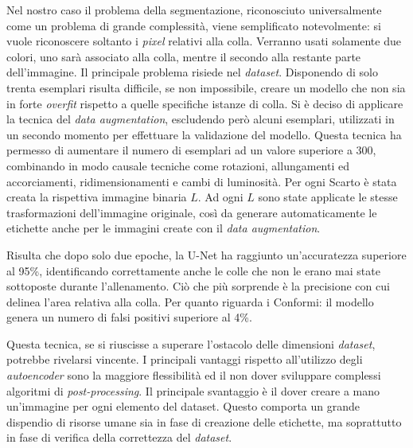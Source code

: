 Nel nostro caso il problema della segmentazione, riconosciuto universalmente come un problema di grande complessità, viene semplificato notevolmente: si vuole riconoscere soltanto i \textit{pixel} relativi alla colla.
Verranno usati solamente due colori, uno sarà associato alla colla, mentre il secondo alla restante parte dell'immagine.
Il principale problema risiede nel \textit{dataset}.
Disponendo di solo trenta esemplari risulta difficile, se non impossibile, creare un modello che non sia in forte \textit{overfit} rispetto a quelle specifiche istanze di colla.
Si è deciso di applicare la tecnica del \textit{data augmentation}, escludendo però alcuni esemplari, utilizzati in un secondo momento per effettuare la validazione del modello.
Questa tecnica ha permesso di aumentare il numero di esemplari ad un valore superiore a 300, combinando in modo causale tecniche come rotazioni, allungamenti ed accorciamenti, ridimensionamenti e cambi di luminosità.
Per ogni Scarto è stata creata la rispettiva immagine binaria $L$.
Ad ogni $L$ sono state applicate le stesse trasformazioni dell'immagine originale, così da generare automaticamente le etichette anche per le immagini create con il \textit{data augmentation}.

Risulta che dopo solo due epoche, la U-Net ha raggiunto un'accuratezza superiore al 95\%, identificando correttamente anche le colle che non le erano mai state sottoposte durante l'allenamento.
Ciò che più sorprende è la precisione con cui delinea l'area relativa alla colla.
Per quanto riguarda i Conformi: il modello genera un numero di falsi positivi superiore al 4\%.

Questa tecnica, se si riuscisse a superare l'ostacolo delle dimensioni \textit{dataset}, potrebbe rivelarsi vincente.
I principali vantaggi rispetto all'utilizzo degli \textit{autoencoder} sono la maggiore flessibilità ed il non dover sviluppare complessi algoritmi di \textit{post-processing}.
Il principale svantaggio è il dover creare a mano un'immagine per ogni elemento del dataset.
Questo comporta un grande dispendio di risorse umane sia in fase di creazione delle etichette, ma soprattutto in fase di verifica della correttezza del \textit{dataset}.

